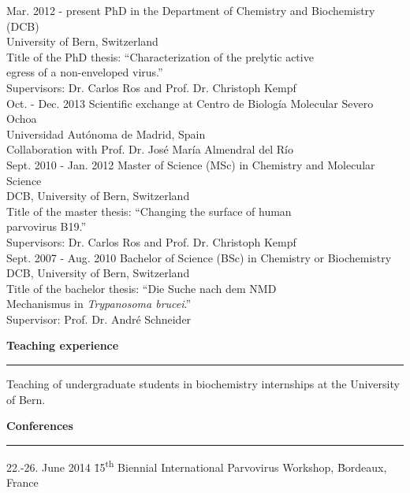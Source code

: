 \normalsize
\vspace{-0.5cm}
\begin{tabbing}
Mar. 2012 - present \hspace*{0.9cm} \= PhD in the Department of Chemistry and Biochemistry (DCB) \\ 
\> University of Bern, Switzerland  \\
\> Title of the PhD thesis: ``Characterization of the prelytic active \\ 
\> egress of a non-enveloped virus.'' \\
\> Supervisors: Dr. Carlos Ros and Prof. Dr. Christoph Kempf \\ [0.3cm]
Oct. - Dec. 2013 \> Scientific exchange at Centro de Biología Molecular Severo Ochoa \\
\> Universidad Autónoma de Madrid, Spain \\
\> Collaboration with Prof. Dr. José María Almendral del Río \\ [0.3cm]
Sept. 2010 - Jan. 2012 \> Master of Science (MSc) in Chemistry and Molecular Science \\
\> DCB, University of Bern, Switzerland  \\
\> Title of the master thesis: ``Changing the surface of human \\ \> parvovirus B19.'' \\
\> Supervisors: Dr. Carlos Ros and Prof. Dr. Christoph Kempf \\ [0.3cm]
Sept. 2007 - Aug. 2010 \> Bachelor of Science (BSc) in Chemistry or Biochemistry \\
\> DCB, University of Bern, Switzerland  \\
\> Title of the bachelor thesis: ``Die Suche nach dem NMD \\
\> Mechanismus in \textit{Trypanosoma brucei}.'' \\
\> Supervisor: Prof. Dr. André Schneider
\end{tabbing}

\large
\textbf{Teaching experience}
\noindent\rule[3mm]{\linewidth}{1pt}

\normalsize
\vspace{-0.2cm}
Teaching of undergraduate students in biochemistry internships at the University of Bern.

\vspace{0.3 cm}
\large
\textbf{Conferences}
\noindent\rule[3mm]{\linewidth}{1pt}

\normalsize
\vspace{-0.6 cm}
\begin{tabbing}
22.-26. June 2014 \hspace{1.27 cm} \= 15\textsuperscript{th} Biennial International Parvovirus Workshop, \hspace{0.1 cm} \= Bordeaux, France
\end{tabbing}



